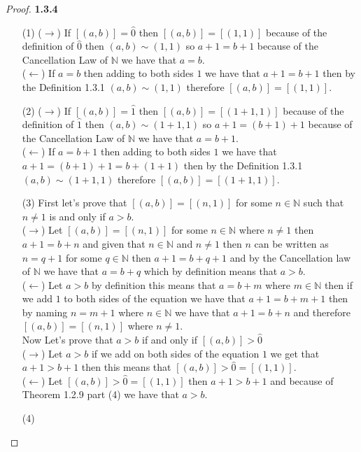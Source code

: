 \documentclass[11pt]{article}
\newcommand{\N}{\mathbb{N}}
\theoremstyle{definition}
\begin{document}
    \begin{proof}{\textbf{1.3.4}}
    \begin{itemize}
        \item [(1)]
        ($\rightarrow$) If $[(a,b)]=\hat{0}$ then $[(a,b)] = [(1,1)]$ because of the
        definition of $\hat{0}$ then $(a,b) \sim (1,1)$ so $a+1=b+1$ because of the
        Cancellation Law of $\N$ we have that $a=b$.\\
        ($\leftarrow$) If $a=b$ then adding to both sides $1$ we have that $a+1=b+1$
        then by the Definition 1.3.1 $(a,b)\sim(1,1)$ therefore $[(a,b)]=[(1,1)]$.
        \item [(2)]
        ($\rightarrow$) If $[(a,b)]=\hat{1}$ then $[(a,b)] = [(1+1,1)]$ because of the
        definition of $\hat{1}$ then $(a,b) \sim (1+1,1)$ so $a+1=(b+1)+1$ because of
        the Cancellation Law of $\N$ we have that $a=b+1$.\\
        ($\leftarrow$) If $a=b+1$ then adding to both sides $1$ we have that
        $a+1=(b+1)+1=b+(1+1)$ then by the Definition 1.3.1 $(a,b)\sim(1+1,1)$
        therefore $[(a,b)]=[(1+1,1)]$.
        \item [(3)]
        First let's prove that $[(a,b)]=[(n,1)]$ for some $n \in \N$ such that
        $n \neq 1$ is and only if $a>b$.\\
        ($\rightarrow$) Let $[(a,b)]=[(n,1)]$ for some $n \in \N$ where $n \neq 1$ then
        $a+1=b+n$ and given that $n\in\N$ and $n \neq 1$ then $n$ can be written as
        $n = q +1$ for some $q\in\N$ then $a+1=b+q+1$ and by the Cancellation law of
        $\N$ we have that $a=b+q$ which by definition means that $a>b$.\\
        ($\leftarrow$) Let $a>b$ by definition this means that $a = b +m$ where $m\in\N$
        then if we add $1$ to both sides of the equation we have that
        $a + 1 = b + m + 1$ then by naming $n = m + 1$ where $n \in \N$ we have that
        $a+1=b+n$ and therefore $[(a,b)]=[(n,1)]$ where $n \neq 1$.\\
        Now Let's prove that $a>b$ if and only if $[(a,b)]>\hat{0}$\\
        ($\rightarrow$) Let $a>b$  if we add on both sides of the equation $1$ we get
        that $a+1>b+1$ then this means that $[(a,b)]>\hat{0}=[(1,1)]$.\\
        ($\leftarrow$) Let $[(a,b)]>\hat{0}=[(1,1)]$ then $a+1>b+1$ and because of
        Theorem 1.2.9 part (4) we have that $a>b$.
        \item [(4)]

\end{itemize}
\end{proof}
\end{document}
